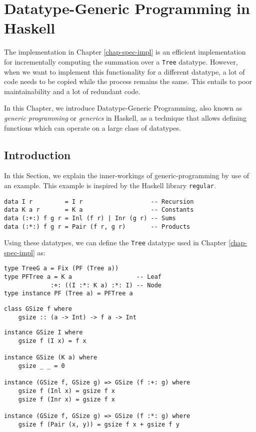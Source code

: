 \chapter{Datatype-Generic Programming in Haskell}

The implementation in Chapter \ref{chap-spec-impl} is an efficient implementation for incrementally computing the summation over a \texttt{Tree} datatype. However, when we want to implement this functionality for a different datatype, a lot of code needs to be copied while the process remains the same. This entails to poor maintainability and a lot of redundant code.

In this Chapter, we introduce Datatype-Generic Programming, also known as \textit{generic programming} or \textit{generics} in Haskell, as a technique that allows defining functions which can operate on a large class of datatypes. 

\section{Introduction}
In this Section, we explain the inner-workings of generic-programming by use of an example. This example is inspired by the Haskell library \texttt{regular}.
\begin{verbatim}
data I r         = I r                   -- Recursion
data K a r       = K a                   -- Constants
data (:+:) f g r = Inl (f r) | Inr (g r) -- Sums
data (:*:) f g r = Pair (f r, g r)       -- Products
\end{verbatim}

Using these datatypes, we can define the \texttt{Tree} datatype used in Chapter \ref{chap-spec-impl} as:

\begin{verbatim}
type TreeG a = Fix (PF (Tree a))
type PFTree a = K a                  -- Leaf
             :+: ((I :*: K a) :*: I) -- Node
type instance PF (Tree a) = PFTree a
\end{verbatim}

\begin{verbatim}
class GSize f where
    gsize :: (a -> Int) -> f a -> Int
\end{verbatim}

\begin{verbatim}
instance GSize I where
    gsize f (I x) = f x

instance GSize (K a) where
    gsize _ _ = 0

instance (GSize f, GSize g) => GSize (f :+: g) where
    gsize f (Inl x) = gsize f x
    gsize f (Inr x) = gsize f x

instance (GSize f, GSize g) => GSize (f :*: g) where
    gsize f (Pair (x, y)) = gsize f x + gsize f y
\end{verbatim}

